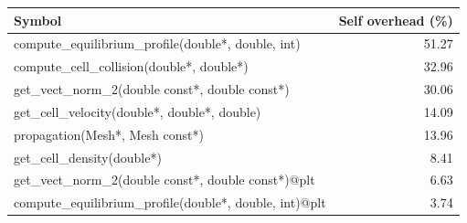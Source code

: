 \begin{tabular}{@{}lr@{}}
\toprule
Symbol & Self overhead (\%) \\
\midrule
compute\_equilibrium\_profile(double*, double, int) & 51.27 \\
compute\_cell\_collision(double*, double*) & 32.96 \\
get\_vect\_norm\_2(double const*, double const*) & 30.06 \\
get\_cell\_velocity(double*, double*, double) & 14.09 \\
propagation(Mesh*, Mesh const*) & 13.96 \\
get\_cell\_density(double*) & 8.41 \\
get\_vect\_norm\_2(double const*, double const*)@plt & 6.63 \\
compute\_equilibrium\_profile(double*, double, int)@plt & 3.74 \\
\bottomrule
\end{tabular}
